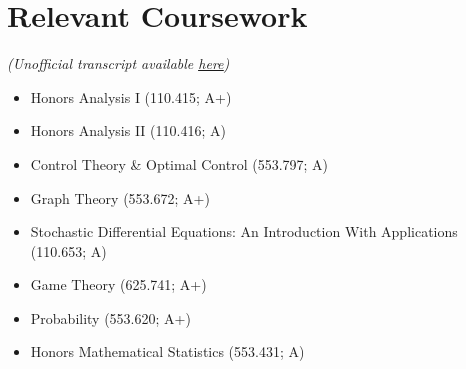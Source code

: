 \documentclass[letterpaper,11pt]{article}
\newcommand{\resumeItem}[2]{
  \item\small{
    \textbf{#1}{#2 \vspace{-2pt}}
  }
}
\newcommand{\resumeSubItem}[2]{\resumeItem{#1}{#2}\vspace{-4pt}}
\newcommand{\resumeSubHeadingListStart}{\begin{itemize}[leftmargin=*,rightmargin=\dimexpr\linewidth-0.9\textwidth-\leftmargin\relax]}
\newcommand{\resumeSubHeadingListEnd}{\end{itemize}}
\begin{document}
\iffalse
\section{Projects (Clickable)}
  \resumeSubHeadingListStart
    \resumeSubItem{\href{https://ahmed.science}{Website}: }
      {Designed a personal portfolio using the Django Python framework.}
    \resumeSubItem{\href{https://github.com/ArmaanAhmed22/CompareCoCversusNonCoC}{Hospital Accreditation Comparison}: }
      {Comparison of survival rates between hospitals with and without CoC accreditation.}
    \resumeSubItem{\href{https://github.com/ArmaanAhmed22/VariabilityAnalyzer}{Variability Analyzer}: }
      {Tool to analyze variability and entropy of genomic sequences}
    \resumeSubItem{\href{https://github.com/ArmaanAhmed22/NonSpecificLAMPDesign}{LAMP primer design for quasispecies amplification}: }
      {Designed a system to generate sensitive LAMP primers, able to overcome target variability.}
    \resumeSubItem{\href{https://github.com/ArmaanAhmed22/ReactionMechanizer}{ReactionMechanizer}: }
      {Created a program to simulate chemical reactions and analyze kinetics.}
  \resumeSubHeadingListEnd
\fi
%


\newpage

\section{Relevant Coursework}

  \textit{(Unofficial transcript available \href{https://raw.githubusercontent.com/ArmaanAhmed22/resume/master/Transcript.pdf}{\underline{here}})}



\begin{multicols}{3}
  \begin{itemize}[leftmargin=*,itemsep=0.5em,parsep=0pt]
    \item Honors Analysis I (110.415; A+)
    \item Honors Analysis II (110.416; A)
    \item Control Theory \& Optimal Control (553.797; A)
    \item Graph Theory (553.672; A+)
    \item Stochastic Differential Equations: An Introduction With Applications (110.653; A)
    \item Game Theory (625.741; A+)
    \item Probability (553.620; A+)
    \item Honors Mathematical Statistics (553.431; A)
  \end{itemize}
\end{multicols}
\end{document}
